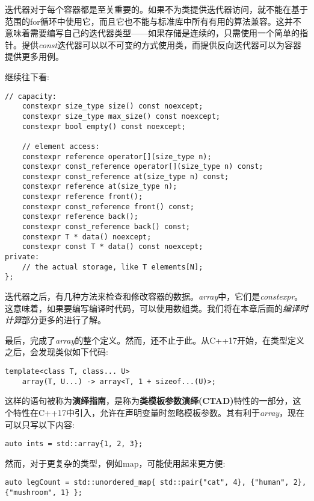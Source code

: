 迭代器对于每个容器都是至关重要的。如果不为类提供迭代器访问，就不能在基于范围的for循环中使用它，而且它也不能与标准库中所有有用的算法兼容。这并不意味着需要编写自己的迭代器类型——如果存储是连续的，只需使用一个简单的指针。提供\textit{const}迭代器可以以不可变的方式使用类，而提供反向迭代器可以为容器提供更多用例。

继续往下看:

\begin{lstlisting}[style=styleCXX]
	// capacity:
	constexpr size_type size() const noexcept;
	constexpr size_type max_size() const noexcept;
	constexpr bool empty() const noexcept;
	
	// element access:
	constexpr reference operator[](size_type n);
	constexpr const_reference operator[](size_type n) const;
	constexpr const_reference at(size_type n) const;
	constexpr reference at(size_type n);
	constexpr reference front();
	constexpr const_reference front() const;
	constexpr reference back();
	constexpr const_reference back() const;
	constexpr T * data() noexcept;
	constexpr const T * data() const noexcept;
private:
	// the actual storage, like T elements[N];
};
\end{lstlisting}

迭代器之后，有几种方法来检查和修改容器的数据。\textit{array}中，它们是\textit{constexpr}。这意味着，如果要编写编译时代码，可以使用数组类。我们将在本章后面的\textit{编译时计算}部分更多的进行了解。

最后，完成了\textit{array}的整个定义。然而，还不止于此。从C++17开始，在类型定义之后，会发现类似如下代码:

\begin{lstlisting}[style=styleCXX]
template<class T, class... U>
	array(T, U...) -> array<T, 1 + sizeof...(U)>;
\end{lstlisting}

这样的语句被称为\textbf{演绎指南}，是称为\textbf{类模板参数演绎(CTAD)}特性的一部分，这个特性在C++17中引入，允许在声明变量时忽略模板参数。其有利于\textit{array}，现在可以只写以下内容:

\begin{lstlisting}[style=styleCXX]
auto ints = std::array{1, 2, 3};
\end{lstlisting}

然而，对于更复杂的类型，例如map，可能使用起来更方便:

\begin{lstlisting}[style=styleCXX]
auto legCount = std::unordered_map{ std::pair{"cat", 4}, {"human", 2}, {"mushroom", 1} };
\end{lstlisting}

